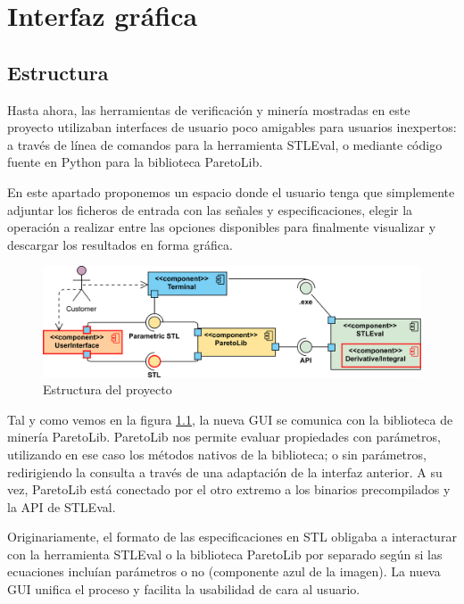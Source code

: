 \chapter{Interfaz gráfica}
\label{cha:gui}

\section{Estructura}
Hasta ahora, las herramientas de verificación y minería mostradas en este proyecto utilizaban interfaces de usuario poco amigables para usuarios inexpertos: a través de línea de comandos para la herramienta STLEval, o mediante código fuente en Python para la biblioteca ParetoLib.

En este apartado proponemos un espacio donde el usuario tenga que simplemente adjuntar los ficheros de entrada con las señales y especificaciones, elegir la operación a realizar entre las opciones disponibles para finalmente visualizar y descargar los resultados en forma gráfica.

\begin{figure}[htb]
\centering
  \includegraphics[width=.95\linewidth]{images/uml_diagram}
\caption{Estructura del proyecto}
\label{fig:est}
\end{figure}

Tal y como vemos en la figura \ref{fig:est}, la nueva GUI se comunica con la biblioteca de minería ParetoLib. ParetoLib nos permite evaluar propiedades con parámetros, utilizando en ese caso los métodos nativos de la biblioteca; o sin parámetros, redirigiendo la consulta a través de una adaptación de la interfaz anterior. A su vez, ParetoLib está conectado por el otro extremo a los binarios precompilados y la API de STLEval.

Originariamente, el formato de las especificaciones en STL obligaba a interacturar con la herramienta STLEval o la biblioteca ParetoLib por separado según si las ecuaciones incluían parámetros o no (componente azul de la imagen).
La nueva GUI unifica el proceso y facilita la usabilidad de cara al usuario.


